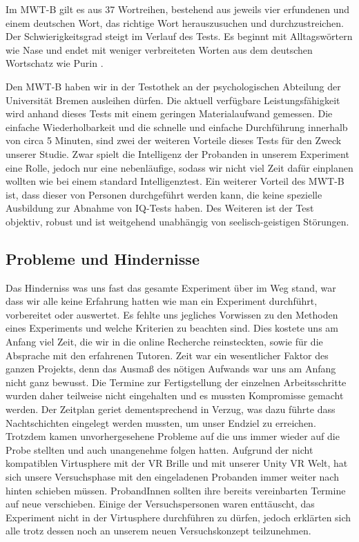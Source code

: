 \documentclass{Bericht}
\begin{document}
Im MWT-B gilt es aus 37 Wortreihen, bestehend aus jeweils vier erfundenen und einem deutschen Wort, das richtige Wort herauszusuchen und durchzustreichen. Der Schwierigkeitsgrad steigt im Verlauf des Tests. Es beginnt mit Alltagswörtern wie \glqq Nase\glqq{} und endet mit weniger verbreiteten Worten aus dem deutschen Wortschatz wie \glqq Purin\glqq{} .

Den MWT-B haben wir in der Testothek an der psychologischen Abteilung der Universität Bremen ausleihen dürfen. Die aktuell verfügbare Leistungsfähigkeit wird anhand dieses Tests mit einem geringen Materialaufwand gemessen. Die einfache Wiederholbarkeit und die schnelle und einfache Durchführung innerhalb von circa 5 Minuten, sind zwei der weiteren Vorteile dieses Tests für den Zweck unserer Studie. Zwar spielt die Intelligenz der Probanden in unserem Experiment eine Rolle, jedoch nur eine nebenläufige, sodass wir nicht viel Zeit dafür einplanen wollten wie bei einem standard Intelligenztest. Ein weiterer Vorteil des MWT-B ist, dass dieser von Personen durchgeführt werden kann, die keine spezielle Ausbildung zur Abnahme von IQ-Tests haben. Des Weiteren ist der Test objektiv, robust und ist weitgehend unabhängig von seelisch-geistigen Störungen.

\subsection{Probleme und Hindernisse}
Das Hinderniss was uns fast das gesamte Experiment über im Weg stand, war dass wir alle keine Erfahrung hatten wie man ein Experiment durchführt, vorbereitet oder auswertet. Es fehlte uns jegliches Vorwissen zu den Methoden eines Experiments und welche Kriterien zu beachten sind. Dies kostete uns am Anfang viel Zeit, die wir in die online Recherche reinsteckten, sowie für die Absprache mit den erfahrenen Tutoren. Zeit war ein wesentlicher Faktor des ganzen Projekts, denn das Ausmaß des nötigen Aufwands war uns am Anfang nicht ganz bewusst. Die Termine zur Fertigstellung der einzelnen Arbeitsschritte wurden daher teilweise nicht eingehalten und es mussten Kompromisse gemacht werden. Der Zeitplan geriet dementsprechend in Verzug, was dazu führte dass Nachtschichten eingelegt werden mussten, um unser Endziel zu erreichen. Trotzdem kamen unvorhergesehene Probleme auf die uns immer wieder auf die Probe stellten und auch unangenehme folgen hatten. Aufgrund der nicht kompatiblen Virtusphere mit der VR Brille und mit unserer Unity VR Welt, hat sich unsere Versuchsphase mit den eingeladenen Probanden immer weiter nach hinten schieben müssen. ProbandInnen sollten ihre bereits vereinbarten Termine auf neue verschieben. Einige der Versuchspersonen waren enttäuscht, das Experiment nicht in der Virtusphere durchführen zu dürfen, jedoch erklärten sich alle trotz dessen noch an unserem neuen Versuchskonzept teilzunehmen.
\end{document}
